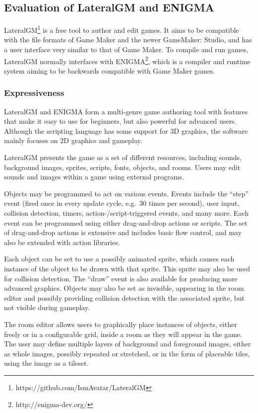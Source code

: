 \subsection{Evaluation of LateralGM and ENIGMA}

LateralGM\footnote{https://github.com/IsmAvatar/LateralGM} is a free tool to 
author and edit games. It aims to be compatible with the file formats of Game 
Maker and the newer GameMaker: Studio, and has a user interface very similar 
to that of Game Maker. To compile and run games, LateralGM normally interfaces 
with ENIGMA\footnote{http://enigma-dev.org/}, which is a compiler and runtime 
system aiming to be backwards compatible with Game Maker games.

\subsubsection{Expressiveness}
LateralGM and ENIGMA form a multi-genre game authoring tool with features that 
make it easy to use for beginners, but also powerful for advanced users. 
Although the scripting language has some support for 3D 
graphics\cite{enigma3d}, the software mainly focuses on 2D graphics and 
gameplay.

LateralGM presents the game as a set of different resources, including sounds, 
background images, sprites, scripts, fonts, objects, and rooms. Users may edit 
sounds and images within a game using external programs.

Objects may be programmed to act on various events. Events include the 
``step'' event (fired once in every update cycle, e.g.\ 30 times per second), 
user input, collision detection, timers, action-/script-triggered events, and 
many more\cite{lgmevents}. Each event can be programmed using either 
drag-and-drop actions or scripts. The set of drag-and-drop actions is 
extensive and includes basic flow control, and may also be extended with 
action libraries.

Each object can be set to use a possibly animated sprite, which causes each 
instance of the object to be drawn with that sprite. This sprite may also be 
used for collision detection. The ``draw'' event is also available for 
producing more advanced graphics. Objects may also be set as invisible, 
appearing in the room editor and possibly providing collision detection with 
the associated sprite, but not visible during gameplay.

The room editor allows users to graphically place instances of objects, either 
freely or in a configurable grid, inside a room as they will appear in the 
game. The user may define multiple layers of background and foreground images, 
either as whole images, possibly repeated or stretched, or in the form of 
placeable tiles, using the image as a tileset.

